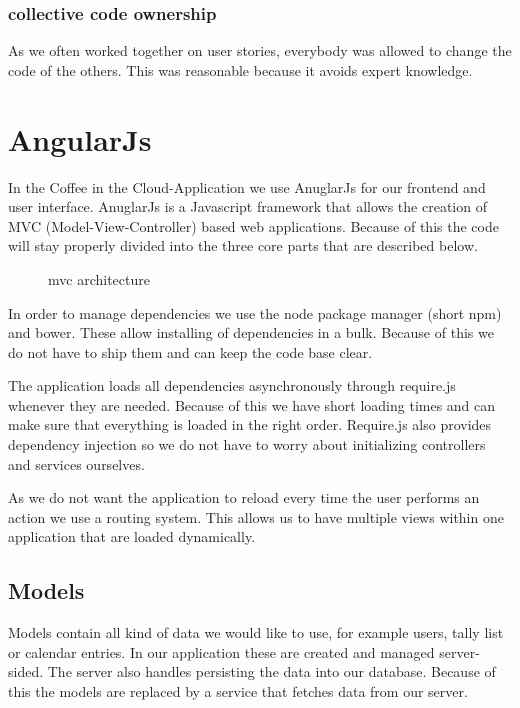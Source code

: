 \subsubsection{collective code ownership}\label{collective-code-ownership}

As we often worked together on user stories, everybody was allowed to
change the code of the others. This was reasonable because it avoids
expert knowledge.

\newpage
\newpage
\section{AngularJs}\label{angularjs}

In the Coffee in the Cloud-Application we use AnuglarJs for our frontend
and user interface. AnuglarJs is a Javascript framework that allows the
creation of MVC (Model-View-Controller) based web applications. Because
of this the code will stay properly divided into the three core parts
that are described below.

\begin{figure}[htbp]
\centering
{}
\caption{mvc architecture}
\end{figure}

In order to manage dependencies we use the node package manager (short
npm) and bower. These allow installing of dependencies in a bulk.
Because of this we do not have to ship them and can keep the code base
clear.

The application loads all dependencies asynchronously through require.js
whenever they are needed. Because of this we have short loading times
and can make sure that everything is loaded in the right order.
Require.js also provides dependency injection so we do not have to worry
about initializing controllers and services ourselves.

As we do not want the application to reload every time the user performs
an action we use a routing system. This allows us to have multiple views
within one application that are loaded dynamically.

\subsection{Models}\label{models}

Models contain all kind of data we would like to use, for example users,
tally list or calendar entries. In our application these are created and
managed server-sided. The server also handles persisting the data into
our database. Because of this the models are replaced by a service that
fetches data from our server.

